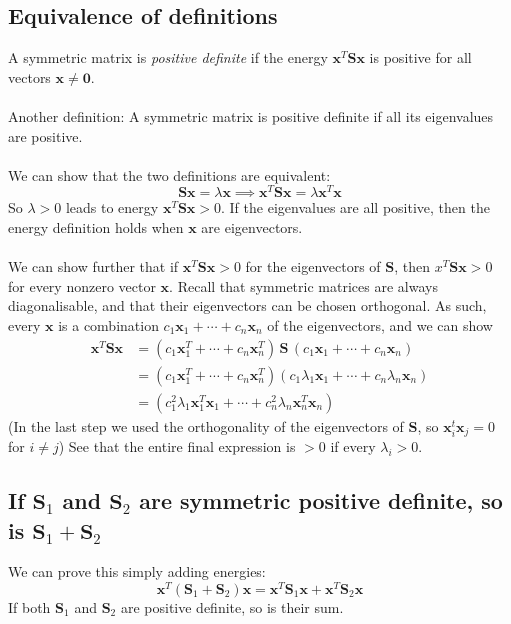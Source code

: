 \documentclass{report}
\begin{document}
\subsection{Equivalence of definitions}
A symmetric matrix is \textit{positive definite} if the energy $\bm x^T\bm{Sx}$ is positive for all vectors $\bm x\neq\bm0$.\\
\vspace{1mm}\\
Another definition: A symmetric matrix is positive definite if all its eigenvalues are positive.\\
\vspace{1mm}\\
We can show that the two definitions are equivalent:
\begin{equation*}
\bm{Sx}=\lambda\bm x\implies\bm x^T\bm{Sx}=\lambda\bm x^T\bm x
\end{equation*}
So $\lambda>0$ leads to energy $\bm x^T\bm{Sx}>0$. If the eigenvalues are all positive, then the energy definition holds when $\bm x$ 
are eigenvectors.\\
\vspace{1mm}\\
We can show further that
if $\bm x^T\bm{Sx}>0$ for the eigenvectors of $\bm S$, then $x^T\bm{Sx}>0$ for every nonzero vector $\bm x$. Recall that symmetric matrices
are always diagonalisable, and that their eigenvectors can be chosen orthogonal. As such, every $\bm x$ is a combination 
$c_1\bm x_1+\cdots+c_n\bm x_n$ of the eigenvectors, and we can show
\begin{align*}
\bm x^T\bm{Sx}&=(c_1\bm x_1^T+\cdots+c_n\bm x_n^T)\,\bm S\,(c_1\bm x_1+\cdots+c_n\bm x_n)\\
&=(c_1\bm x_1^T+\cdots+c_n\bm x_n^T)(c_1\lambda_1\bm x_1+\cdots+c_n\lambda_n\bm x_n)\\
&=(c_1^2\lambda_1\bm x_1^T\bm x_1+\cdots+c_n^2\lambda_n\bm x_n^T\bm x_n)
\end{align*}
(In the last step we used the orthogonality of the eigenvectors of $\bm S$, so $\bm x_i^t\bm x_j=0$ for $i\neq j$) See that the entire final 
expression is $>0$ if every $\lambda_i>0$.

\subsection{If $\bm S_1$ and $\bm S_2$ are symmetric positive definite, so is $\bm S_1+\bm S_2$}
We can prove this simply adding energies:
\begin{equation*}
\bm x^T(\bm S_1+\bm S_2)\bm x=\bm x^T\bm S_1\bm x+\bm x^T\bm S_2\bm x
\end{equation*}
If both $\bm S_1$ and $\bm S_2$ are positive definite, so is their sum.
\newpage
\end{document}
